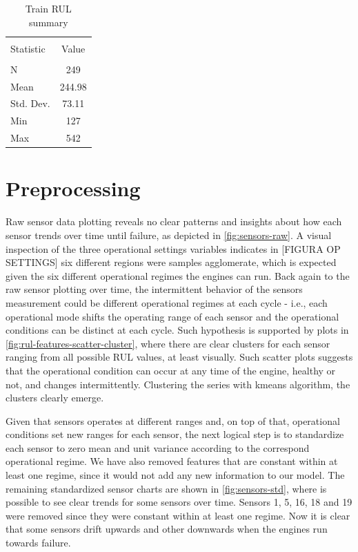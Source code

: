 \documentclass[letterpaper, 10 pt, conference, onecolumn]{ieeeconf}  %
\begin{document}
\begin{table}[!h]
    \centering
    \begin{tabular}{l|c}
        \hline 
        \hline \\[-1.8ex] 
        Statistic & Value \\
        \hline \\[-1.8ex] 
         N & 249 \\
         Mean & 244.98 \\
         Std. Dev. & 73.11 \\
         Min & 127 \\
         Max & 542 \\
         \hline
         \hline
    \end{tabular}
    \caption{Train RUL summary}
    \label{tab:rul-train-summary}
\end{table}


\section{Preprocessing}\label{sec:preprocess}
Raw sensor data plotting reveals no clear patterns and insights about how each sensor trends over time until failure, as depicted in \autoref{fig:sensors-raw}. A visual inspection of the three operational settings variables indicates in [FIGURA OP SETTINGS] six different regions were samples agglomerate, which is expected given the six different operational regimes the engines can run. Back again to the raw sensor plotting over time, the intermittent behavior of the sensors measurement could be different operational regimes at each cycle - i.e., each operational mode shifts the operating range of each sensor and the operational conditions can be distinct at each cycle. Such hypothesis is supported by plots in \autoref{fig:rul-features-scatter-cluster}, where there are clear clusters for each sensor ranging from all possible RUL values, at least visually. Such scatter plots suggests that the operational condition can occur at any time of the engine, healthy or not, and changes intermittently. Clustering the series with kmeans algorithm, the clusters clearly emerge. 

Given that sensors operates at different ranges and, on top of that, operational conditions set new ranges for each sensor, the next logical step is to standardize each sensor to zero mean and unit variance according to the correspond operational regime. We have also removed features that are constant within at least one regime, since it would not add any new information to our model. The remaining standardized sensor charts are shown in \autoref{fig:sensors-std}, where is possible to see clear trends for some sensors over time. Sensors 1, 5, 16, 18 and 19 were removed since they were constant within at least one regime. Now it is clear that some sensors drift upwards and other downwards when the engines run towards failure. 
\end{document}
